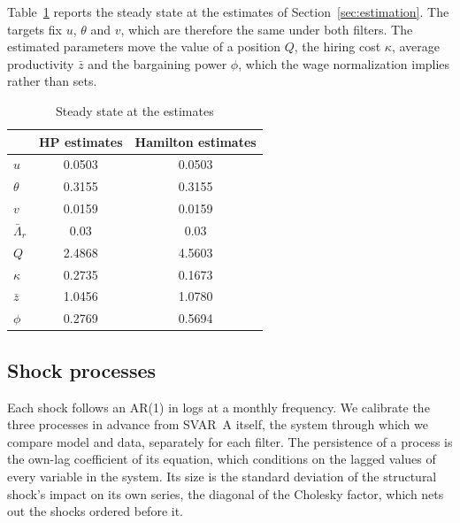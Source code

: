 \documentclass[authoryear, review, 12pt]{elsarticle}
\begin{document}
Table~\ref{tab:ss} reports the steady state at the estimates of Section~\ref{sec:estimation}. The targets fix $u$, $\theta$ and $v$, which are therefore the same under both filters. The estimated parameters move the value of a position $Q$, the hiring cost $\kappa$, average productivity $\bar z$ and the bargaining power $\phi$, which the wage normalization implies rather than sets.

\begin{table}[H]
\centering
\caption{Steady state at the estimates}\label{tab:ss}
\small
\begin{tabular}{lcc}
\toprule
 & HP estimates & Hamilton estimates \\
\midrule
$u$ & 0.0503 & 0.0503 \\
$\theta$ & 0.3155 & 0.3155 \\
$v$ & 0.0159 & 0.0159 \\
$\bar\Lambda_r$ & 0.03 & 0.03 \\
$Q$ & 2.4868 & 4.5603 \\
$\kappa$ & 0.2735 & 0.1673 \\
$\bar z$ & 1.0456 & 1.0780 \\
$\phi$ & 0.2769 & 0.5694 \\
\bottomrule
\end{tabular}
\end{table}

\subsection{Shock processes}\label{sec:shocks}

Each shock follows an AR(1) in logs at a monthly frequency. We calibrate the three processes in advance from SVAR~A itself, the system through which we compare model and data, separately for each filter. The persistence of a process is the own-lag coefficient of its equation, which conditions on the lagged values of every variable in the system. Its size is the standard deviation of the structural shock's impact on its own series, the diagonal of the Cholesky factor, which nets out the shocks ordered before it.
\end{document}
